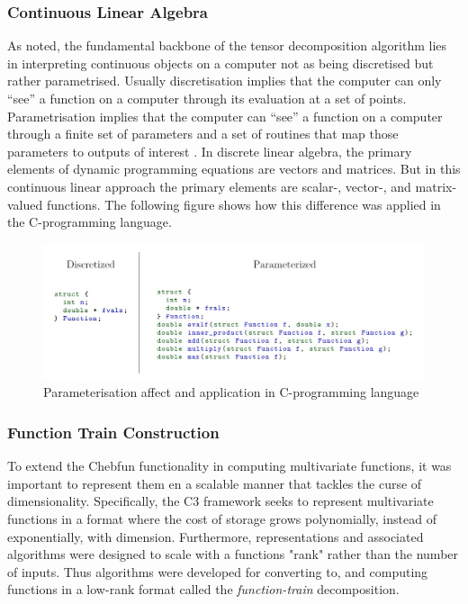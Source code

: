 \documentclass[11pt,draftd]{article}
\begin{document}
\subsubsection{Continuous Linear Algebra}
As noted, the fundamental backbone of the tensor decomposition algorithm lies in interpreting continuous objects on a computer not as being discretised but rather parametrised. Usually discretisation implies that the computer can only “see” a function on a computer through its evaluation at a set of points. Parametrisation implies that the computer can “see” a function on a computer through a finite set of parameters and a set of routines that map those parameters to outputs of interest \cite{thesis}. In discrete linear algebra, the primary elements of dynamic programming equations are vectors and matrices. But in this continuous linear approach the primary elements are scalar-, vector-, and matrix-valued functions. The following figure shows how this difference was applied in the C-programming language.

\begin{figure}[h!]
	\centering
	\includegraphics[scale = 0.4]{images/ContinuousLinearAlgebraDifference1}
	\caption{Parameterisation affect and application in C-programming language}
\end{figure}

\subsubsection{Function Train Construction}
To extend the Chebfun functionality in computing multivariate functions, it was important to represent them en a scalable manner that tackles the curse of dimensionality. Specifically, the C3 framework seeks to represent multivariate functions in a format where the cost of storage grows polynomially, instead of exponentially, with dimension. Furthermore, representations and associated algorithms were designed to scale with a functions "rank" rather than the number of inputs. Thus algorithms were developed for converting to, and computing functions in a low-rank format called the \textit{function-train} decomposition.
\end{document}
